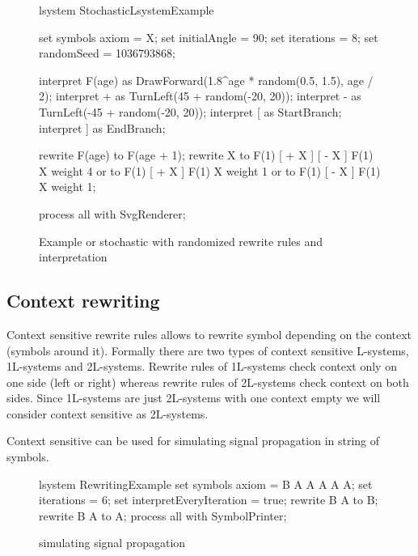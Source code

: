 \begin{figure}[ht]
	\begin{Lsystem}
lsystem StochasticLsystemExample {
	set symbols axiom = X;
	set initialAngle = 90;
	set iterations = 8;
	set randomSeed = 1036793868;

	interpret F(age) as DrawForward(1.8^age * random(0.5, 1.5), age / 2);
	interpret + as TurnLeft(45 + random(-20, 20));
	interpret - as TurnLeft(-45 + random(-20, 20));
	interpret [ as StartBranch;
	interpret ] as EndBranch;

	rewrite F(age) to F(age + 1);
	rewrite X
		to F(1) [ + X ] [ - X ] F(1) X  weight 4 or
		to F(1) [ + X ] F(1) X          weight 1 or
		to F(1) [ - X ] F(1) X          weight 1;
}
process all with SvgRenderer;
	\end{Lsystem}
	\caption{Example or stochastic \lsystems with randomized rewrite rules and interpretation}
	\label{fig:randExample}
\end{figure}


\subsection{Context rewriting}

\newcommand{\onelsystems}{\mbox{1L-systems}\xspace}
\newcommand{\twolsystems}{\mbox{2L-systems}\xspace}

Context sensitive rewrite rules allows to rewrite symbol depending on the context (symbols around it).
Formally there are two types of context sensitive L-systems, \onelsystems and \twolsystems.
Rewrite rules of \onelsystems check context only on one side (left or right) whereas rewrite rules of \twolsystems check context on both sides.
Since \onelsystems are just \twolsystems with one context empty we will consider context sensitive \lsystems as \twolsystems.

Context sensitive \lsystems can be used for simulating signal propagation in string of symbols.

\begin{figure}[ht]
	\begin{Lsystem}
lsystem RewritingExample {
	set symbols axiom = B A A A A A;
	set iterations = 6;
	set interpretEveryIteration = true;
	rewrite {B} A     to B;
	rewrite     B {A} to A;
}
process all with SymbolPrinter;
	\end{Lsystem}
	\caption{\lsystem simulating signal propagation}
	\label{fig:signalPropagarionSrc}
\end{figure}

